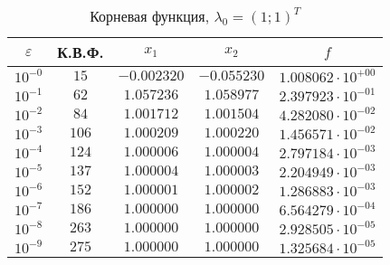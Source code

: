 \documentclass[a4paper,12pt,notitlepage,pdftex,headsepline]{scrartcl}
\begin{document}
        \begin{table}[ht]
          \centering
          \caption{Корневая функция, $\lambda_0 = (1; 1)^T$}
          \begin{tabular}{|c|c|c|c|c|}
            \hline
            $\varepsilon$ & К.В.Ф. & $x_1$ & $x_2$ & $f$\\
            \hline
            $10^{-0}$ & $15$ & $-0.002320$ & $-0.055230$ & $1.008062\cdot 10^{+00}$\\
            $10^{-1}$ & $62$ & $1.057236$ & $1.058977$ & $2.397923\cdot 10^{-01}$\\
            $10^{-2}$ & $84$ & $1.001712$ & $1.001504$ & $4.282080\cdot 10^{-02}$\\
            $10^{-3}$ & $106$ & $1.000209$ & $1.000220$ & $1.456571\cdot 10^{-02}$\\
            $10^{-4}$ & $124$ & $1.000006$ & $1.000004$ & $2.797184\cdot 10^{-03}$\\
            $10^{-5}$ & $137$ & $1.000004$ & $1.000003$ & $2.204949\cdot 10^{-03}$\\
            $10^{-6}$ & $152$ & $1.000001$ & $1.000002$ & $1.286883\cdot 10^{-03}$\\
            $10^{-7}$ & $186$ & $1.000000$ & $1.000000$ & $6.564279\cdot 10^{-04}$\\
            $10^{-8}$ & $263$ & $1.000000$ & $1.000000$ & $2.928505\cdot 10^{-05}$\\
            $10^{-9}$ & $275$ & $1.000000$ & $1.000000$ & $1.325684\cdot 10^{-05}$\\
            \hline
          \end{tabular}
        \end{table}
\end{document}
